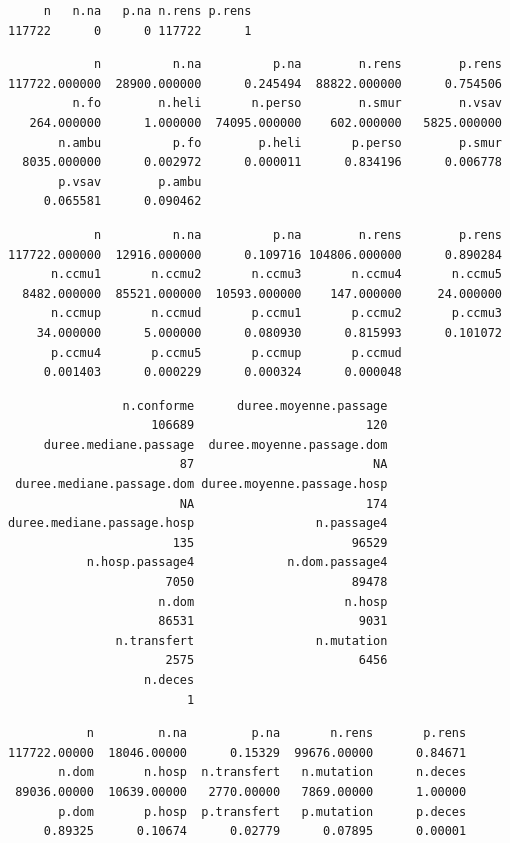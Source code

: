\documentclass[]{article}
\begin{document}
\begin{verbatim}
     n   n.na   p.na n.rens p.rens 
117722      0      0 117722      1 
\end{verbatim}

\begin{verbatim}
            n          n.na          p.na        n.rens        p.rens 
117722.000000  28900.000000      0.245494  88822.000000      0.754506 
         n.fo        n.heli       n.perso        n.smur        n.vsav 
   264.000000      1.000000  74095.000000    602.000000   5825.000000 
       n.ambu          p.fo        p.heli       p.perso        p.smur 
  8035.000000      0.002972      0.000011      0.834196      0.006778 
       p.vsav        p.ambu 
     0.065581      0.090462 
\end{verbatim}

\begin{verbatim}
            n          n.na          p.na        n.rens        p.rens 
117722.000000  12916.000000      0.109716 104806.000000      0.890284 
      n.ccmu1       n.ccmu2       n.ccmu3       n.ccmu4       n.ccmu5 
  8482.000000  85521.000000  10593.000000    147.000000     24.000000 
      n.ccmup       n.ccmud       p.ccmu1       p.ccmu2       p.ccmu3 
    34.000000      5.000000      0.080930      0.815993      0.101072 
      p.ccmu4       p.ccmu5       p.ccmup       p.ccmud 
     0.001403      0.000229      0.000324      0.000048 
\end{verbatim}

\begin{verbatim}
                n.conforme      duree.moyenne.passage 
                    106689                        120 
     duree.mediane.passage  duree.moyenne.passage.dom 
                        87                         NA 
 duree.mediane.passage.dom duree.moyenne.passage.hosp 
                        NA                        174 
duree.mediane.passage.hosp                 n.passage4 
                       135                      96529 
           n.hosp.passage4             n.dom.passage4 
                      7050                      89478 
                     n.dom                     n.hosp 
                     86531                       9031 
               n.transfert                 n.mutation 
                      2575                       6456 
                   n.deces 
                         1 
\end{verbatim}

\begin{verbatim}
           n         n.na         p.na       n.rens       p.rens 
117722.00000  18046.00000      0.15329  99676.00000      0.84671 
       n.dom       n.hosp  n.transfert   n.mutation      n.deces 
 89036.00000  10639.00000   2770.00000   7869.00000      1.00000 
       p.dom       p.hosp  p.transfert   p.mutation      p.deces 
     0.89325      0.10674      0.02779      0.07895      0.00001 
\end{verbatim}
\end{document}
